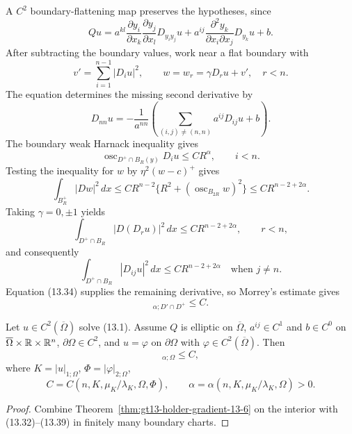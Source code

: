 A $C^2$ boundary-flattening map preserves the hypotheses, since
\begin{equation}
Qu=a^{kl}\frac{\partial y_i}{\partial x_k}
\frac{\partial y_j}{\partial x_l}D_{y_iy_j}u
+a^{ij}\frac{\partial^2y_k}{\partial x_i\partial x_j}D_{y_k}u+b.
\tag{13.32}
\end{equation}
After subtracting the boundary values, work near a flat boundary with
\begin{equation}
v'=\sum_{i=1}^{n-1}|D_iu|^2,
\qquad w=w_r=\gamma D_ru+v',\quad r<n.
\tag{13.33}
\end{equation}
The equation determines the missing second derivative by
\begin{equation}
D_{nn}u=-\frac1{a^{nn}}
\left(\sum_{(i,j)\ne(n,n)}a^{ij}D_{ij}u+b\right).
\tag{13.34}
\end{equation}
The boundary weak Harnack inequality gives
\begin{equation}
\operatorname{osc}_{D^+\cap B_R(y)}D_iu\le CR^\alpha,
\qquad i<n.
\tag{13.35}
\end{equation}
Testing the inequality for $w$ by $\eta^2(w-c)^+$ gives
\begin{equation}
\int_{B_R^+}|Dw|^2\,dx
\le CR^{n-2}\{R^2+(\operatorname{osc}_{B_{2R}}w)^2\}
\le CR^{n-2+2\alpha}.
\tag{13.36}
\end{equation}
Taking $\gamma=0,\pm1$ yields
\begin{equation}
\int_{D^+\cap B_R}|D(D_ru)|^2\,dx\le CR^{n-2+2\alpha},
\qquad r<n,
\tag{13.37}
\end{equation}
and consequently
\begin{equation}
\int_{D^+\cap B_R}|D_{ij}u|^2\,dx\le CR^{n-2+2\alpha}
\quad\text{when }j\ne n.
\tag{13.38}
\end{equation}
Equation \textup{(13.34)} supplies the remaining derivative, so Morrey's
estimate gives
\begin{equation}
[Du]_{\alpha;D'\cap D^+}\le C.
\tag{13.39}
\end{equation}

\begin{theorem}
\label{thm:gt13-holder-gradient-13-7}
Let $u\in C^2(\overline\Omega)$ solve \textup{(13.1)}.  Assume $Q$ is
elliptic on $\overline\Omega$, $a^{ij}\in C^1$ and $b\in C^0$ on
$\overline\Omega\times\mathbb{R}\times\mathbb{R}^n$, $\partial\Omega\in C^2$, and
$u=\varphi$ on $\partial\Omega$ with
$\varphi\in C^2(\overline\Omega)$.  Then
\begin{equation}
[Du]_{\alpha;\Omega}\le C,
\tag{13.40}
\end{equation}
where $K=|u|_{1;\Omega}$, $\Phi=|\varphi|_{2;\Omega}$,
\[
C=C(n,K,\mu_K/\lambda_K,\Omega,\Phi),
\qquad
\alpha=\alpha(n,K,\mu_K/\lambda_K,\Omega)>0.
\]
\end{theorem}
\begin{proof}
\sketch Combine Theorem~\ref{thm:gt13-holder-gradient-13-6} on the interior
with \textup{(13.32)--(13.39)} in finitely many boundary charts.
\end{proof}

